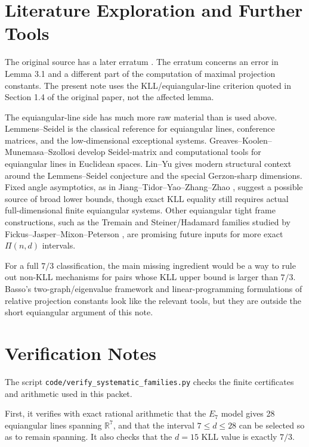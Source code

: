 \documentclass[11pt]{article}
\newcommand{\R}{\mathbb{R}}
\newcommand{\PiRel}{\Pi}
\begin{document}
\section*{Literature Exploration and Further Tools}

The original source has a later erratum \cite{BassoErratum2024}.  The erratum
concerns an error in Lemma 3.1 and a different part of the computation of
maximal projection constants.  The present note uses the KLL/equiangular-line
criterion quoted in Section 1.4 of the original paper, not the affected lemma.

The equiangular-line side has much more raw material than is used above.
Lemmens--Seidel \cite{LS1973} is the classical reference for equiangular
lines, conference matrices, and the low-dimensional exceptional systems.
Greaves--Koolen--Munemasa--Szollosi \cite{GKMS2014} develop Seidel-matrix and
computational tools for equiangular lines in Euclidean spaces.  Lin--Yu
\cite{LinYu2018} gives modern structural context around the
Lemmens--Seidel conjecture and the special Gerzon-sharp dimensions.  Fixed
angle asymptotics, as in Jiang--Tidor--Yao--Zhang--Zhao
\cite{JiangTidorYaoZhangZhao2021}, suggest a possible source of broad lower
bounds, though exact KLL equality still requires actual full-dimensional
finite equiangular systems.  Other equiangular tight frame constructions,
such as the Tremain and Steiner/Hadamard families studied by
Fickus--Jasper--Mixon--Peterson \cite{FJMP2016}, are promising future inputs
for more exact \(\PiRel(n,d)\) intervals.

For a full \(7/3\) classification, the main missing ingredient would be a way
to rule out non-KLL mechanisms for pairs whose KLL upper bound is larger than
\(7/3\).  Basso's two-graph/eigenvalue framework and linear-programming
formulations of relative projection constants look like the relevant tools,
but they are outside the short equiangular argument of this note.

\section*{Verification Notes}

The script \texttt{code/verify\_systematic\_families.py} checks the finite
certificates and arithmetic used in this packet.

First, it verifies with exact rational arithmetic that the \(E_7\) model gives
28 equiangular lines spanning \(\R^7\), and that the interval
\(7\le d\le28\) can be selected so as to remain spanning.  It also checks that
the \(d=15\) KLL value is exactly \(7/3\).
\end{document}
